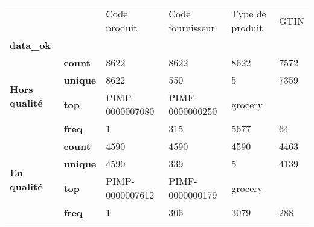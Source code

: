 \begin{tabularx}{\linewidth}{lXXXXX}
\toprule
           &      &     Code produit & Code fournisseur & Type de produit &  GTIN \\
\textbf{data\_ok} & {} &                  &                  &                 &       \\
\midrule
\multirow{4}{*}{\textbf{Hors qualité}} & \textbf{count} &             8622 &             8622 &            8622 &  7572 \\
           & \textbf{unique} &             8622 &              550 &               5 &  7359 \\
           & \textbf{top} &  PIMP-0000007080 &  PIMF-0000000250 &         grocery &       \\
           & \textbf{freq} &                1 &              315 &            5677 &    64 \\
\cline{1-6}
\multirow{4}{*}{\textbf{En qualité}} & \textbf{count} &             4590 &             4590 &            4590 &  4463 \\
           & \textbf{unique} &             4590 &              339 &               5 &  4139 \\
           & \textbf{top} &  PIMP-0000007612 &  PIMF-0000000179 &         grocery &       \\
           & \textbf{freq} &                1 &              306 &            3079 &   288 \\
\bottomrule
\end{tabularx}
